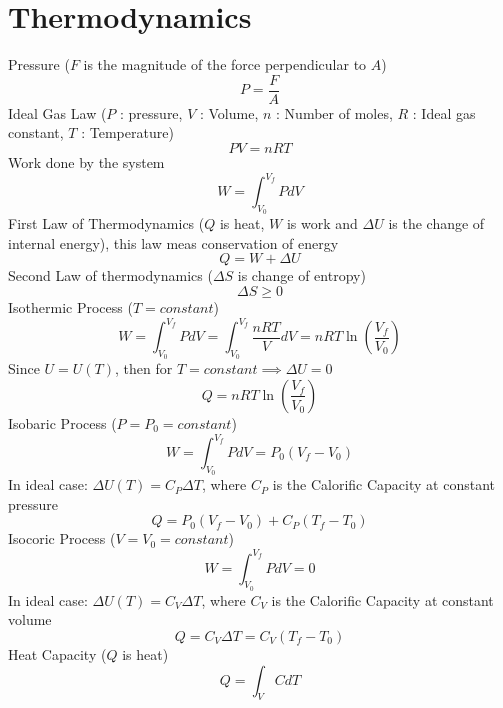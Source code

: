 \documentclass{article}
\begin{document}
\section{Thermodynamics}
Pressure ($F$ is the magnitude of the force perpendicular to $A$)
\begin{equation}
  P = \frac{F}{A}
\end{equation}
Ideal Gas Law ($P$ : pressure, $V$ : Volume, $n$ : Number of moles, $R$ : Ideal gas constant, $T$ : Temperature)
\begin{equation}
  PV = nRT
\end{equation}
Work done by the system
\begin{equation}
  W = \int_{V_0}^{V_f} P dV
\end{equation}
First Law of Thermodynamics ($Q$ is heat, $W$ is work and $\Delta U$ is the change of internal energy), this law meas conservation of energy
\begin{equation}
  Q = W + \Delta U
\end{equation}
Second Law of thermodynamics ($\Delta S$ is change of entropy)
\begin{equation}
  \Delta S \ge 0
\end{equation}
Isothermic Process ($T = constant$)
\begin{equation}
  W = \int_{V_0}^{V_f} P dV =  \int_{V_0}^{V_f} \frac{nRT}{V} dV = nRT \ln(\frac{V_f}{V_0})
\end{equation}
Since $U=U(T)$, then for $T=constant \implies \Delta U = 0$
\begin{equation}
  Q = nRT \ln(\frac{V_f}{V_0})
\end{equation}
Isobaric Process ($P = P_0 = constant$)
\begin{equation}
  W = \int_{V_0}^{V_f} P dV = P_0(V_f - V_0)
\end{equation}
In ideal case: $\Delta U(T) = C_P\Delta T$, where $C_P$ is the Calorific Capacity at constant pressure 
\begin{equation}
  Q = P_0(V_f - V_0) + C_P(T_f - T_0)
\end{equation}
Isocoric Process ($V = V_0 = constant$)
\begin{equation}
  W = \int_{V_0}^{V_f} P dV = 0
\end{equation}
In ideal case: $\Delta U(T) = C_V\Delta T$, where $C_V$ is the Calorific Capacity at constant volume
\begin{equation}
  Q = C_V\Delta T = C_V(T_f - T_0)
\end{equation}
Heat Capacity ($Q$ is heat)
\begin{equation}
  Q = \int_V C dT
\end{equation}
\end{document}
